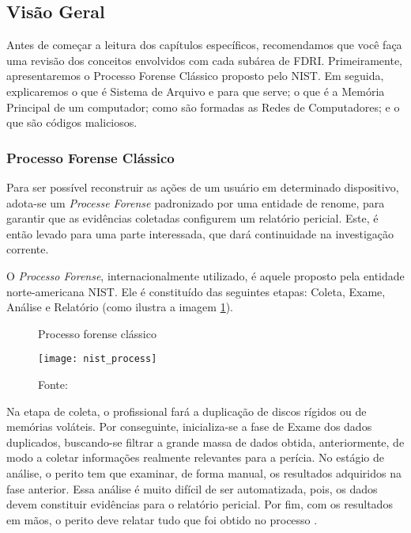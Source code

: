     \subsection{Visão Geral} \label{cap1_visao_geral}
    
    \hspace{1cm}
    Antes de começar a leitura dos capítulos específicos, recomendamos que você faça uma revisão dos conceitos envolvidos com cada subárea de FDRI. Primeiramente, apresentaremos o Processo Forense Clássico proposto pelo NIST. Em seguida, explicaremos o que é Sistema de Arquivo e para que serve; o que é a Memória Principal de um computador; como são formadas as Redes de Computadores; e o que são códigos maliciosos.
    
    \subsubsection{Processo Forense Clássico} \label{cap1_visao_geral_procfor}
    
    \hspace{1cm}
    Para ser possível reconstruir as ações de um usuário em determinado dispositivo, adota-se um \textit{Processe Forense} padronizado por uma entidade de renome, para garantir que as evidências coletadas configurem um relatório pericial. Este, é então levado para uma parte interessada, que dará continuidade na investigação corrente.

    \vspace{4mm}

    \hspace{1cm}
    O \textit{Processo Forense}, internacionalmente utilizado, é aquele proposto pela entidade norte-americana NIST. Ele é constituído das seguintes etapas: Coleta, Exame, Análise e Relatório (como ilustra a imagem \ref{nist_proc}).

    \begin{figure}[H]
    	\centering
    	\caption{Processo forense clássico}
    	\texttt{[image: nist\_process]}
    	\caption*{Fonte: }
    	\label{nist_proc}
    \end{figure}
    
    \hspace{1cm}
    Na etapa de coleta, o profissional fará a duplicação de discos rígidos ou de memórias voláteis. Por conseguinte, inicializa-se a fase de Exame dos dados duplicados, buscando-se filtrar a grande massa de dados obtida, anteriormente, de modo a coletar informações realmente relevantes para a perícia. No estágio de análise, o perito tem que examinar, de forma manual, os resultados adquiridos na fase anterior. Essa análise é muito difícil de ser automatizada, pois, os dados devem constituir evidências para o relatório pericial. Por fim, com os resultados em mãos, o perito deve relatar tudo que foi obtido no processo \cite{kent2006}.
        
